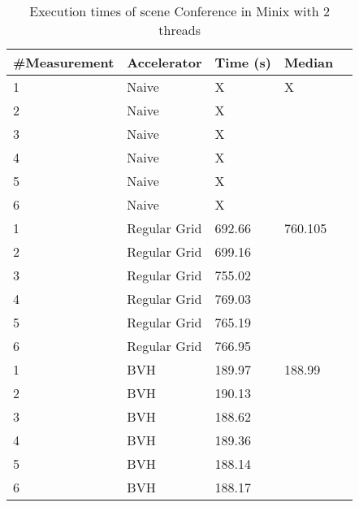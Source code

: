 \begin{table}[H]
	\small
	\begin{tabular}{|l|l|l|l|l|}
		\hline
		\#Measurement & Accelerator & Time (s) & Median \\ \hline
		1 & Naive & X & X \\ \hline
		2 & Naive & X & \\ \hline
		3 & Naive & X & \\ \hline
		4 & Naive & X & \\ \hline
		5 & Naive & X & \\ \hline
		6 & Naive & X & \\ \hline
		1 & Regular Grid & 692.66 & 760.105 \\ \hline
		2 & Regular Grid & 699.16 & \\ \hline
		3 & Regular Grid & 755.02 & \\ \hline
		4 & Regular Grid & 769.03 & \\ \hline
		5 & Regular Grid & 765.19 & \\ \hline
		6 & Regular Grid & 766.95 & \\ \hline
		1 & BVH & 189.97 & 188.99 \\ \hline
		2 & BVH & 190.13 & \\ \hline
		3 & BVH & 188.62 & \\ \hline
		4 & BVH & 189.36 & \\ \hline
		5 & BVH & 188.14 & \\ \hline
		6 & BVH & 188.17 & \\ \hline
	\end{tabular}
	\label{Time}
	\caption{Execution times of scene Conference in Minix with 2 threads}
\end{table}

